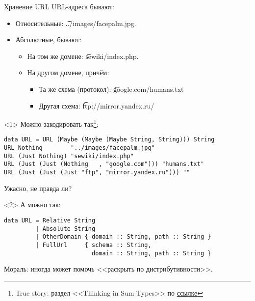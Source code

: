 \begin{frame}[t,fragile]{Хранение URL}
	URL-адреса бывают:
	\begin{itemize}
		\item Относительные: \t{../images/facepalm.jpg}.
		\item Абсолютные, бывают:
			\begin{itemize}
				\item На том же домене: \t{sewiki/index.php}.
				\item На другом домене, причём:
					\begin{itemize}
						\item Та же схема (протокол): \t{google.com/humans.txt}
	                    \item Другая схема: \t{ftp://mirror.yandex.ru/}
                   	\end{itemize}
			\end{itemize}
	\end{itemize}
\begin{onlyenv}<1>
	Можно закодировать так\footnote{True story: раздел <<Thinking in Sum Types>> по \href{https://chadaustin.me/2015/07/sum-types/}{ссылке}}:
\begin{verbatim}
data URL = URL (Maybe (Maybe (Maybe String, String))) String
URL Nothing        "../images/facepalm.jpg"
URL (Just Nothing) "sewiki/index.php"
URL (Just (Just (Nothing   , "google.com"))) "humans.txt"
URL (Just (Just (Just "ftp", "mirror.yandex.ru"))) ""
\end{verbatim}
Ужасно, не правда ли?
\end{onlyenv}

\begin{onlyenv}<2>
А можно так:
\begin{verbatim}
data URL = Relative String
         | Absolute String
         | OtherDomain { domain :: String, path :: String }
         | FullUrl     { schema :: String,
                         domain :: String, path :: String }
\end{verbatim}
Мораль: иногда может помочь <<раскрыть по дистрибутивности>>.
\end{onlyenv}
\end{frame}

